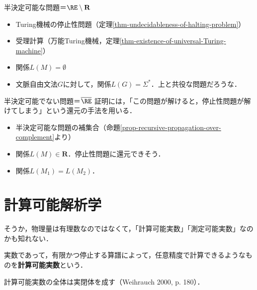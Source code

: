 \begin{itembox}[l]{半決定可能な問題＝$\RE\setminus\mathbf{R}$}
    \begin{itemize}
        \item Turing機械の停止性問題（定理\ref{thm-undecidableness-of-halting-problem}）
        \item 受理計算（万能Turing機械，定理\ref{thm-existence-of-universal-Turing-machine}）
        \item 関係$L(M)=\emptyset$
        \item 文脈自由文法$G$に対して，関係$L(G)=\Sigma^*$．上と共役な問題だろうな．
    \end{itemize}
\end{itembox}

\begin{itembox}[l]{半決定可能でない問題＝$\overline{\RE}$}
    証明には，「この問題が解けると，停止性問題が解けてしまう」という還元の手法を用いる．
    \begin{itemize}
        \item 半決定可能な問題の補集合（命題\ref{prop-recursive-propagation-over-complement}より）
        \item 関係$L(M)\in\mathbf{R}$．停止性問題に還元できそう．
        \item 関係$L(M_1)=L(M_2)$．
    \end{itemize}
\end{itembox}

\section{計算可能解析学}

\begin{tcolorbox}[colframe=ForestGreen, colback=ForestGreen!10!white, breakable]
    そうか，物理量は有理数なのではなくて，「計算可能実数」「測定可能実数」なのかも知れない．
\end{tcolorbox}

\begin{definition}
    実数であって，有限かつ停止する算譜によって，任意精度で計算できるようなものを\textbf{計算可能実数}という．
\end{definition}

\begin{proposition}
    計算可能実数の全体は実閉体を成す（Weihrauch 2000, p. 180）．
\end{proposition}

